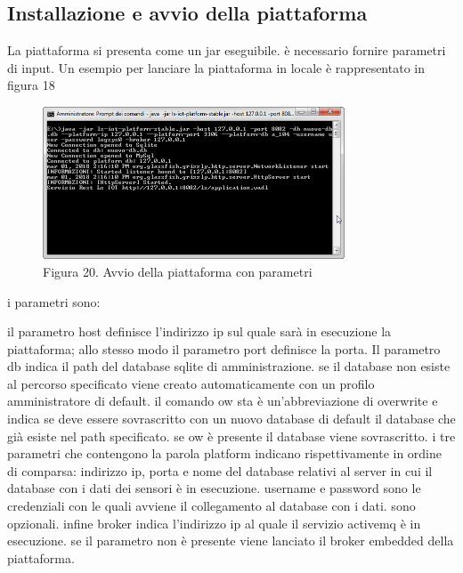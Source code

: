 \subsection{Installazione e avvio della piattaforma}
La piattaforma si presenta come un jar eseguibile. è necessario fornire parametri di input. Un esempio per lanciare la piattaforma in locale è rappresentato in figura 18
\begin{figure}[h]
			\centering
			\includegraphics[width=0.8\textwidth]{lancio-piattaforma.png}
			\caption*{Figura 20. Avvio della piattaforma con parametri}
\end{figure}

i parametri sono:
{\selectfont
	
}
il parametro host definisce l'indirizzo ip sul quale sarà in esecuzione la piattaforma; allo stesso modo il parametro port definisce la porta.
Il parametro db indica il path del database sqlite di amministrazione. se il database non esiste al percorso specificato viene creato automaticamente con un profilo amministratore di default. il comando ow sta è un'abbreviazione di overwrite e indica se deve essere sovrascritto con un nuovo database di default il database che già esiste nel path specificato. se ow è presente il database viene sovrascritto.
i tre parametri che contengono la parola platform indicano rispettivamente in ordine di comparsa: indirizzo ip, porta e nome del database relativi al server in cui il database con i dati dei sensori è in esecuzione.
username e password sono le credenziali con le quali avviene il collegamento al database con i dati. sono opzionali. infine broker indica l'indirizzo ip al quale il servizio activemq è in esecuzione. se il parametro non è presente viene lanciato il broker embedded della piattaforma.
